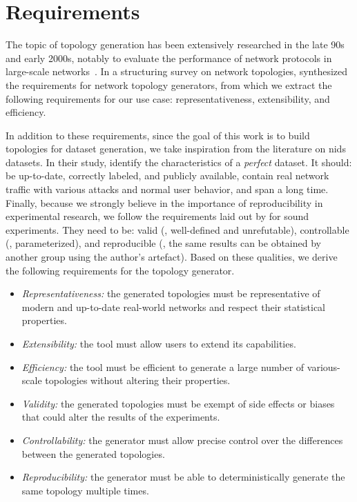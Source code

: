 \section{Requirements\label{sec:topologies.req}}

The topic of topology generation has been extensively researched in the late 90s and early 2000s, notably to evaluate the performance of network protocols in large-scale networks~\cite{medina_BRITEapproachuniversal_2001}.
In a structuring survey on network topologies, \textcite{haddadi_Networktopologiesinference_2008a} synthesized the requirements for network topology generators, from which we extract the following requirements for our use case: representativeness, extensibility, and efficiency.

In addition to these requirements, since the goal of this work is to build topologies for dataset generation, we take inspiration from the literature on \gls{nids} datasets.
In their study, \textcite{ring_surveynetworkbasedintrusion_2019} identify the characteristics of a \emph{perfect} dataset.
It should: be up-to-date, correctly labeled, and publicly available, contain real network traffic with various attacks and normal user behavior, and span a long time.
Finally, because we strongly believe in the importance of reproducibility in experimental research, we follow the requirements laid out by \textcite{uetz_ReproducibleAdaptableLog_2021} for sound experiments.
They need to be: valid (\ie, well-defined and unrefutable), controllable (\eg, parameterized), and reproducible (\ie, the same results can be obtained by another group using the author's artefact).
Based on these qualities, we derive the following requirements for the topology generator.

\begin{itemize}
  \item \emph{Representativeness:} the generated topologies must be representative of modern and up-to-date real-world networks and respect their statistical properties.
  \item \emph{Extensibility:} the tool must allow users to extend its capabilities.
  \item \emph{Efficiency:} the tool must be efficient to generate a large number of various-scale topologies without altering their properties.
  \item \emph{Validity:} the generated topologies must be exempt of side effects or biases that could alter the results of the experiments.
  \item \emph{Controllability:} the generator must allow precise control over the differences between the generated topologies.
  \item \emph{Reproducibility:} the generator must be able to deterministically generate the same topology multiple times.
\end{itemize}


